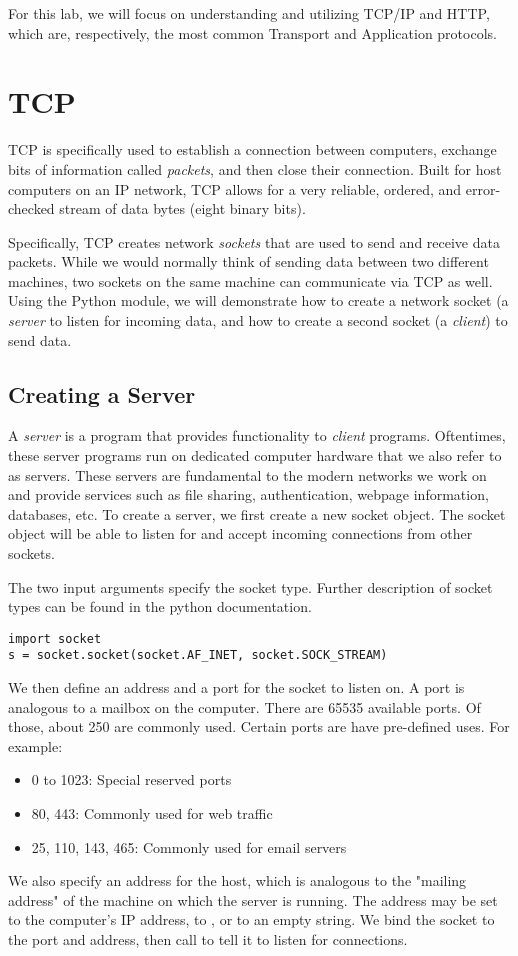 For this lab, we will focus on understanding and utilizing TCP/IP and HTTP, which are, respectively, the most common Transport and Application protocols.

\section*{TCP}
TCP is specifically used to establish a connection between computers, exchange bits of information called \textit{packets}, and then close their connection.
Built for host computers on an IP network, TCP allows for a very reliable, ordered, and error-checked stream of data bytes (eight binary bits).

Specifically, TCP creates network \textit{sockets} that are used to send and receive data packets. While we would normally think of sending data between two different machines, two sockets on the same machine can communicate via TCP as well. Using the Python  module, we will demonstrate how to create a network socket (a \textit{server} to listen for incoming data, and how to create a second socket (a \textit{client}) to send data.



\subsection*{Creating a Server}
A \textit{server} is a program that provides functionality to \textit{client} programs. Oftentimes, these server programs run on dedicated computer hardware that we also refer to as servers. These servers are fundamental to the modern networks we work on and provide services such as file sharing, authentication, webpage information, databases, etc. 
To create a server, we first create a new socket object.
The socket object will be able to listen for and accept incoming connections from other sockets.


The two input arguments specify the socket type. Further description of socket types can be found in the python documentation.

\begin{lstlisting}
import socket
s = socket.socket(socket.AF_INET, socket.SOCK_STREAM)
\end{lstlisting}

We then define an address and a port for the socket to listen on.
A port is analogous to a mailbox on the computer.
There are 65535 available ports.
Of those, about 250 are commonly used.
Certain ports are have pre-defined uses. For example:
\begin{itemize}
        \item 0 to 1023: Special reserved ports
        \item  80, 443: Commonly used for web traffic
        \item 25, 110, 143, 465: Commonly used for email servers
    \end{itemize}
We also specify an address for the host, which is analogous to the "mailing address" of the machine on which the server is running.
The address may be set to the computer's IP address, to , or to an empty string. We bind the socket to the port and address, then call  to tell it to listen for connections.


